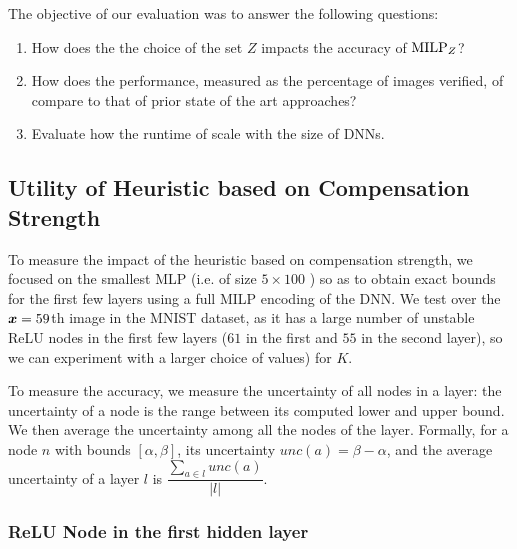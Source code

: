 The  objective of our evaluation was to answer the following  questions:

\begin{enumerate}
	\item How does the the choice of  the set  $Z$ impacts the accuracy of ${\textrm{MILP}}_Z$? 
	\item  How does the performance, measured as the percentage of images verified, of {\toolname} compare to that of prior state of the art approaches? 
	\item Evaluate how the runtime of {\toolname} scale with the size of DNNs.
\end{enumerate}

\subsection{Utility of Heuristic based on Compensation Strength  }

To measure the impact of the heuristic based on compensation strength, we focused on the smallest MLP (i.e. of size $5\times 100$ \cite{crown}) so as to obtain exact bounds for the first few layers using a full MILP encoding of the DNN. We test over the $\boldsymbol{x}=59$th image in the MNIST dataset, as it has a large number of unstable ReLU nodes in the first few layers ($61$ in the first and $55$ in the second layer), so we can experiment with a larger choice of values) for $K$.

To measure the accuracy, we measure the uncertainty of all nodes in a layer:
the uncertainty of a node is the range between its computed lower and upper bound. 
We then average the uncertainty among all the nodes of the layer.
Formally, for a node $n$ with bounds $[\alpha,\beta]$, its uncertainty $unc(a) = \beta - \alpha$, and the average uncertainty of a layer $l$ is $\dfrac{\sum_{a\in l} unc(a)}{|l|}.$



\subsubsection*{ReLU Node in the first hidden layer}


